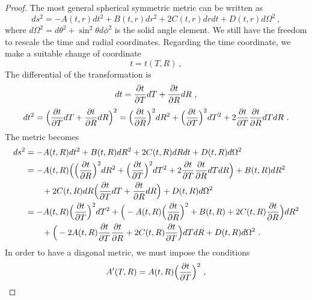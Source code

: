     \begin{proof}
        The most general spherical symmetric metric can be written as 
        \begin{equation*}
            ds^2 = - A(t, r) dt^2 + B(t, r) dr^2 + 2 C(t, r) drdt + D(t,r) d\Omega^2 ~,
        \end{equation*}
        where $d\Omega^2 = d\theta^2 + \sin^2 \theta d\phi^2$ is the solid angle element. We still have the freedom to rescale the time and radial coordinates. 
        Regarding the time coordinate, we make a suitable change of coordinate
        \begin{equation*}
            t = t(T,  R) ~, 
        \end{equation*}
        The differential of the transformation is 
        \begin{equation*}
            dt = \frac{\partial t}{\partial T} dT + \frac{\partial t}{\partial R} d R ~, 
        \end{equation*}
        \begin{equation*}
            dt^2 = \Big ( \frac{\partial t}{\partial T} dT + \frac{\partial t}{\partial R} d R \Big)^2 = \Big ( \frac{\partial t}{\partial R} \Big)^2 d R^2 + \Big ( \frac{\partial t}{\partial T} \Big)^2 dT^2 + 2 \frac{\partial t}{\partial T} \frac{\partial t}{\partial R} dT d R  ~.
        \end{equation*}
        The metric becomes
        \begin{equation*}
        \begin{aligned}
            ds^2 & = - A(t,  R) dt^2 + B(t,  R) d R^2 + 2 C(t,  R) d Rdt + D(t, R) d\Omega^2 \\ & = - A(t,  R) \Big ( \Big ( \frac{\partial t}{\partial R} \Big)^2 d R^2 + \Big ( \frac{\partial t}{\partial T} \Big)^2 dT^2 + 2 \frac{\partial t}{\partial T} \frac{\partial t}{\partial R} dT d R \Big ) + B(t,  R) d R^2 \\ & \qquad + 2 C(t,  R) d R \Big ( \frac{\partial t}{\partial T} dT + \frac{\partial t}{\partial R} d R \Big ) + D(t, R) d\Omega^2 \\ & = - A (t,  R) \Big ( \frac{\partial t}{\partial T} \Big)^2 dT^2 + \Big ( - A (t,  R) \Big( \frac{\partial t}{\partial R} \Big)^2 + B(t, R) + 2 C(t,  R) \frac{\partial t}{\partial R} \Big )d R^2 \\ & \qquad + \Big ( -2 A(t, R) \frac{\partial t}{\partial T} \frac{\partial t}{\partial R} + 2 C(t, R) \frac{\partial t}{\partial T} \Big ) dT d R + D(t, R) d \Omega^2 ~.
        \end{aligned}
        \end{equation*}
        In order to have a diagonal metric, we must impose the conditions
        \begin{equation*}
            A'(T, R) = A (t,  R) \Big ( \frac{\partial t}{\partial T} \Big)^2 ~,
        \end{equation*}
        \begin{equation*}

\end{equation*}
\end{proof}
